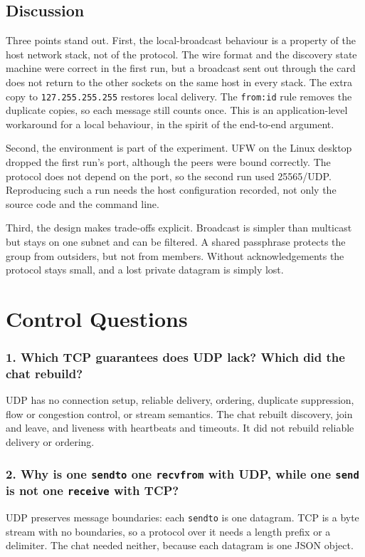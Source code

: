 \documentclass[12pt,a4paper]{article}
\begin{document}
\subsection{Discussion}
Three points stand out. First, the local-broadcast behaviour is a property of the
host network stack, not of the protocol. The wire format and the discovery state
machine were correct in the first run, but a broadcast sent out through the card
does not return to the other sockets on the same host in every stack. The extra copy
to \texttt{127.255.255.255} restores local delivery. The \texttt{from:id} rule
removes the duplicate copies, so each message still counts once. This is an
application-level workaround for a local behaviour, in the spirit of the end-to-end
argument.

Second, the environment is part of the experiment. UFW on the Linux desktop
dropped the first run's port, although the peers were bound correctly. The protocol
does not depend on the port, so the second run used 25565/UDP. Reproducing such a
run needs the host configuration recorded, not only the source code and the
command line.

Third, the design makes trade-offs explicit. Broadcast is simpler than multicast
but stays on one subnet and can be filtered. A shared passphrase protects the group
from outsiders, but not from members. Without acknowledgements the protocol stays
small, and a lost private datagram is simply lost.

\section{Control Questions}
\subsubsection{1. Which TCP guarantees does UDP lack? Which did the chat rebuild?}
UDP has no connection setup, reliable delivery, ordering, duplicate suppression,
flow or congestion control, or stream semantics. The chat rebuilt discovery,
join and leave, and liveness with heartbeats and timeouts. It did not rebuild
reliable delivery or ordering.

\subsubsection{2. Why is one \texttt{sendto} one \texttt{recvfrom} with UDP, while one \texttt{send} is not one \texttt{receive} with TCP?}
UDP preserves message boundaries: each \texttt{sendto} is one datagram. TCP is a
byte stream with no boundaries, so a protocol over it needs a length prefix or a
delimiter. The chat needed neither, because each datagram is one JSON object.
\end{document}
